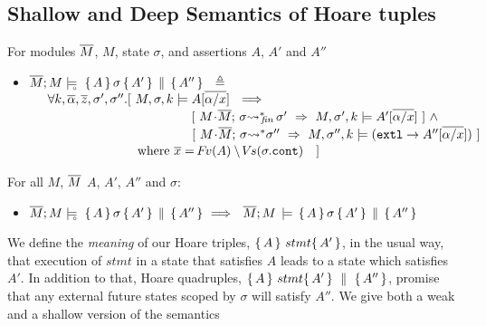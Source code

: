 {\subsection{Shallow and Deep Semantics of Hoare tuples}

\begin{definition}
\label{def:restrict}
For modules $\overline{M}$, $M$, state $\sigma$,  
and assertions $A$, $A'$ and  $A''$
\begin{itemize}
\item
$ {\overline{M};M \models\!\!\!\!_{_{\circ}}\  \, \{\, A\,\}\, \sigma\, \{\, A'\,\} \,\parallel\, \{\, A''\,\}  } \ \ \triangleq \ \ $  \\
$\strut \hspace{.5cm} \forall k,\overline{\alpha}, \overline{z}, \sigma',\sigma''.[
\    %
  \satDAssertFrom M  \sigma k   {A[\overline{\alpha/x}]} \  
  \ \Longrightarrow$\\
$\strut \hspace{4.5cm}    [ \ {\leadstoBoundedStarFin {M\madd \Mtwo}{\sigma}  {\sigma'} }\  \Rightarrow \    \satDAssertFrom M  {\sigma'} k   {A'[\overline{\alpha/x}}]\ ]  \ \wedge$\\
$\strut \hspace{4.5cm}    [ \ {\leadstoBoundedStar  {M\madd \Mtwo}{\sigma}  {\sigma''} }\  \Rightarrow\      \satDAssertFrom M  {\sigma''}  k  {(\externalexec \rightarrow A''[\overline{\alpha/x}])} \ ] $\\
$\strut \hspace{2.3cm}\ \ \  \ \ \ \mbox{where } \overline x={{{\hspace{-1pt}F\hspace{-1pt}}v(A)\setminus{\hspace{-1pt}V\hspace{-1pt}}s(\sigma.\mbox{\normalfont{\texttt{cont}}})}}\ \ \ ]$
\end{itemize}
\end{definition}
}

\begin{lemma} 
For all $M$, $\overline{M}$ $A$, $A'$, $A''$ and $\sigma$:
\begin{itemize}
\item
$ {\overline{M};M \models\!\!\!\!_{_{\circ}}\  \, \{\, A\,\}\, \sigma\, \{\, A'\,\} \,\parallel\, \{\, A''\,\}  } \ \Longrightarrow \ \
  {\overline{M}; M\, \models \, \{\, A\,\}\, \sigma \, \{\, A'\,\} \,\parallel\, \{\, A''\,\}  } $
\end{itemize}
\end{lemma}

\label{sect:HLmeans}

We  define the {\emph {meaning}} of  our Hoare triples, $ \{\, A \, \}\ stmt \{\, A' \, \}$,  in the usual way, \ie that execution of $stmt$ in a state that satisfies $A$ leads to a state which satisfies $A'$.  
In addition to that, Hoare quadruples, $ \{\, A \, \}\ stmt \{\, A' \, \} \, \,\parallel\,\, \{\, A'' \, \} $, promise that any external future states scoped by $\sigma$ will satisfy $A''$.
We give both a weak and a shallow version of the semantics



